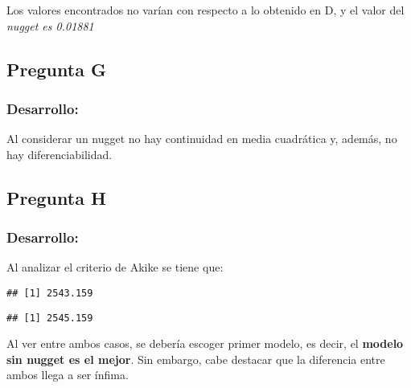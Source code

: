 \documentclass[
]{article}
\newenvironment{Shaded}{\begin{snugshade}}{\end{snugshade}}
\newcommand{\NormalTok}[1]{#1}
\newcommand{\SpecialCharTok}[1]{\textcolor[rgb]{0.00,0.00,0.00}{#1}}
\begin{document}
Los valores encontrados no varían con respecto a lo obtenido en D, y el
valor del \emph{nugget es 0.01881}

\hypertarget{pregunta-g}{%
\subsection{Pregunta G}\label{pregunta-g}}

\hypertarget{desarrollo-6}{%
\subsubsection{Desarrollo:}\label{desarrollo-6}}

Al considerar un nugget no hay continuidad en media cuadrática y,
además, no hay diferenciabilidad.

\hypertarget{pregunta-h}{%
\subsection{Pregunta H}\label{pregunta-h}}

\hypertarget{desarrollo-7}{%
\subsubsection{Desarrollo:}\label{desarrollo-7}}

Al analizar el criterio de Akike se tiene que:

\begin{Shaded}
\end{Shaded}

\begin{verbatim}
## [1] 2543.159
\end{verbatim}

\begin{Shaded}
\end{Shaded}

\begin{verbatim}
## [1] 2545.159
\end{verbatim}

Al ver entre ambos casos, se debería escoger primer modelo, es decir, el
\textbf{modelo sin nugget es el mejor}. Sin embargo, cabe destacar que
la diferencia entre ambos llega a ser ínfima.
\end{document}
